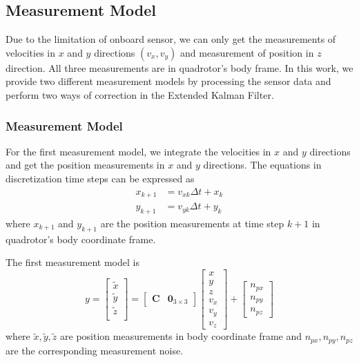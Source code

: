 \documentclass[letterpaper, 10 pt, conference]{ieeeconf}  %
\newcommand{\rom}[1]{\uppercase\expandafter{\romannumeral #1\relax}}
\begin{document}
\subsection{Measurement Model}
Due to the limitation of onboard sensor, we can only get the measurements of velocities in $x$ and $y$ directions $(v_x,v_y)$ and measurement of position in $z$ direction. All three measurements are in quadrotor's body frame. In this work, we provide two different measurement models by processing the sensor data and perform two ways of correction in the Extended Kalman Filter.
\subsubsection{Measurement Model \rom{1}}
For the first measurement model, we integrate the velocities in $x$ and $y$ directions and get the position measurements in $x$ and $y$ directions. The equations in discretization time steps can be expressed as
\begin{equation}
\begin{split}
x_{k+1} &= v_{xk} \Delta t+x_k   \\
y_{k+1} &= v_{yk} \Delta t+y_k
\end{split}
\end{equation} 
where $x_{k+1}$ and $y_{k+1}$ are the position measurements at time step $k+1$ in quadrotor's body coordinate frame.

The first measurement model is
\begin{equation}
\renewcommand\arraystretch{1.2}
y=\begin{bmatrix}
\tilde{x}   \\
\tilde{y}   \\
\tilde{z}   \\
\end{bmatrix}=\begin{bmatrix}
\bm{C} & \bm{0}_{3\times 3}  
\end{bmatrix}\begin{bmatrix}
	x   \\
	y   \\
	z   \\
	v_x   \\
	v_y   \\
	v_z   
\end{bmatrix}+\begin{bmatrix}
n_{px}   \\
n_{py}   \\
n_{pz}
\end{bmatrix}
\end{equation}
where $\tilde{x},\tilde{y},\tilde{z}$ are position measurements in body coordinate frame and $n_{px},n_{py},n_{pz}$ are the corresponding measurement noise. 
\end{document}
